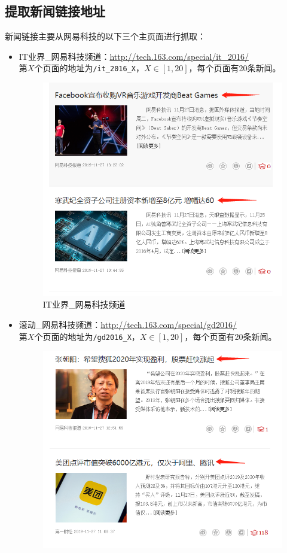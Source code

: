 \documentclass[logo,reportComp]{thesis}
\begin{document}
\subsection{提取新闻链接地址}
新闻链接主要从网易科技的以下三个主页面进行抓取：
\begin{itemize}
    \item IT业界\_网易科技频道：\url{http://tech.163.com/special/it_2016/}\\
    第$X$个页面的地址为\verb'/it_2016_X'，$X\in[1,20]$，每个页面有20条新闻。
    \begin{figure}[H]
        \centering
        \includegraphics[width=0.7\linewidth]{fig/it_netease.png}
        \caption{IT业界\_网易科技频道}
    \end{figure}
    \item 滚动\_网易科技频道：\url{http://tech.163.com/special/gd2016/}\\
    第$X$个页面的地址为\verb'/gd2016_X'，$X\in[1,20]$，每个页面有20条新闻。
    \begin{figure}[H]
        \centering
        \includegraphics[width=0.7\linewidth]{fig/gd_netease.png}

\end{figure}
\end{itemize}
\end{document}
